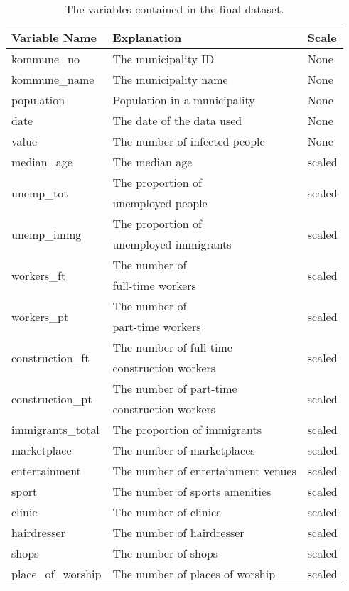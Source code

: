 \begin{table}[H] 
\caption{The variables contained in the final dataset.\label{datasetNorway}}
\begin{tabular}{l l l}
\toprule
\textbf{Variable Name}	& \textbf{Explanation}	& \textbf{Scale}\\
\midrule
kommune\_no & The municipality ID & None \\
kommune\_name & The municipality name & None \\
population & Population in a municipality & None \\
date & The date of the data used & None \\
value & The number of infected people & None \\
median\_age & The median age & scaled \\
\multirow{2}{*}{unemp\_tot} & The proportion of &\multirow{2}{*}{scaled}\\
& unemployed people \\
\multirow{2}{*}{unemp\_immg} & The proportion of & \multirow{2}{*}{scaled}\\
 & unemployed immigrants  \\
\multirow{2}{*}{workers\_ft} & The number of & \multirow{2}{*}{scaled} \\
& full-time workers \\
\multirow{2}{*}{workers\_pt} & The number of & \multirow{2}{*}{scaled} \\
& part-time workers \\
\multirow{2}{*}{construction\_ft} & The number of full-time & \multirow{2}{*}{scaled} \\
& construction workers \\
\multirow{2}{*}{construction\_pt} & The number of part-time & \multirow{2}{*}{scaled} \\
& construction workers \\
immigrants\_total & The proportion of immigrants  & scaled \\
marketplace & The number of marketplaces & scaled \\
entertainment & The number of entertainment venues & scaled \\
sport & The number of sports amenities & scaled \\
clinic & The number of clinics & scaled \\
hairdresser & The number of hairdresser & scaled \\
shops & The number of shops & scaled \\
place\_of\_worship & The number of places of worship & scaled \\

\end{tabular}
\end{table}
